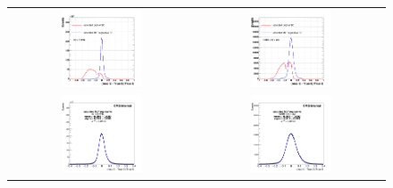 \begin{figure}[bh]
  \begin{center}
    \begin{tabular}{cc}
      \includegraphics[width=0.45\textwidth]{chapters/Zprime/Saturation/images/FlatPt/check_MLP/compare_MLP_Barrel_Endcap_enSC_B_s.png} &
      \includegraphics[width=0.45\textwidth]{chapters/Zprime/Saturation/images/FlatPt/check_MLP/compare_MLP_Barrel_Endcap_enSC_E_s.png} \\
      \includegraphics[width=0.45\textwidth]{chapters/Zprime/Saturation/images/FlatPt/check_MLP/fit_MLP_Barrel_Endcap_B_reg_s.png} &
      \includegraphics[width=0.45\textwidth]{chapters/Zprime/Saturation/images/FlatPt/check_MLP/fit_MLP_Barrel_Endcap_E_reg_s.png}

\end{tabular}
\end{center}
\end{figure}
